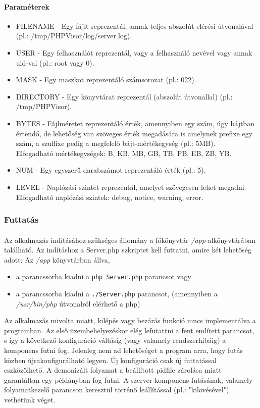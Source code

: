\documentclass[12pt]{report}
\begin{document}
  \paragraph{Paraméterek}
  \begin{itemize}
  \item FILENAME - Egy fájlt reprezentál, annak teljes abszolút elérési útvonalával (pl.: /tmp/PHPVisor/log/server.log).
  \item USER - Egy felhasználót reprezentál, vagy a felhasználó nevével vagy annak uid-val (pl.: root vagy 0).
  \item MASK - Egy maszkot reprezentáló számsorozat (pl.: 022).
  \item DIRECTORY - Egy könyvtárat reprezentál (abszolút útvonallal) (pl.: /tmp/PHPVisor).
  \item BYTES - Fájlméretet reprezentáló érték, amennyiben egy szám, úgy bájtban értendő, de lehetőség van szöveges érték megadására is amelynek prefixe egy szám, a szuffixe pedig a megfelelő bájt-mértékegység (pl.: 5MB). \\  Elfogadható mértékegységek: B, KB, MB, GB, TB, PB, EB, ZB, YB.
  \item NUM - Egy egyszerű darabszámot reprezentáló érték (pl.: 5).
  \item LEVEL - Naplózási szintet reprezentál, amelyet szövegesen lehet megadni. \\
  Elfogadható naplózási szintek: debug, notice, warning, error.
  \end{itemize}
  
  \subsubsection{Futtatás}
  \paragraph{}
  Az alkalmazás indításához szükséges állomány a főkönyvtár \textit{/app} alkönyvtárában található. Az indításhoz a  Server.php szkriptet kell futtatni, amire két lehetőség adott: Az \textit{/app} könyvtárban állva,
  \begin{itemize}
  \item a parancssorba kiadni a \verb|php Server.php| parancsot vagy
  \item a parancssorba kiadni a \verb|./Server.php| parancsot, (amennyiben a \textit{/usr/bin/php} útvonalról elérhető a php)
  \end{itemize}
  Az alkalmazás mivolta miatt, kilépés vagy bezárás funkció nincs implementálva a programban. Az első üzembehelyezéskor elég lefutattni a fent említett parancsot, s így a következő konfiguráció váltásig (vagy valamely rendszerhibáig) a komponens futni fog. Jelenleg nem ad lehetőséget a program arra, hogy futás közben újrakonfigurálható legyen. Új konfiguráció csak új futtatással eszközölhető. A demonizált folyamat a beállított pidfile zárolása miatt garantáltan egy példányban fog futni. A szerver komponens futásának, valamely folyamatkezelő parancson keresztül történő leállítással (pl.: "kilövésével") vethetünk véget.
  
\end{document}
